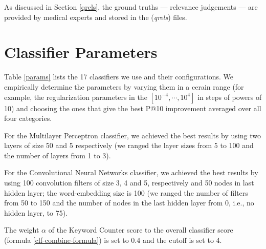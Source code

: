 As discussed in Section \ref{qrels}, the ground truths --- relevance judgements --- are provided by medical experts
and stored in the (\emph{qrels}) files.

\section{Classifier Parameters}
Table \ref{params} lists the 17 classifiers we use and their configurations. 
We empirically determine
the 
parameters by varying them in a cerain range (for example, the regularization parameters
in the $[10^{-4},\cdots,10^4]$ in steps of powers of 10) and choosing the ones
that give the
best P@10 improvement averaged over all four categories.

For the Multilayer Perceptron classifier, we achieved the best results by using two layers of size 50 and 5 respectively
(we ranged the layer sizes from 5 to 100 and the number of layers from 1 to 3).

For the Convolutional Neural Networks classifier, we achieved the best results by
using 100 convolution filters of size 3, 4 and 5, respectively and 50 nodes in last hidden layer; the word-embedding size is 100
(we ranged the number of filters from 50 to 150 and the number of nodes in the last hidden layer from 0, i.e., no hidden layer, to 75).

The weight $\alpha$ of the Keyword Counter score to the overall classifier score (formula \ref{clf-combine-formula}) is set to 0.4 and
the \textsf{cutoff} is set to 4.

